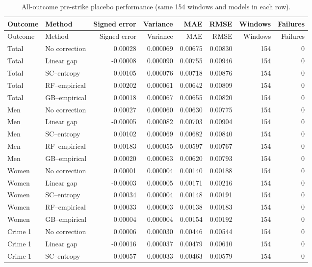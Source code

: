 \begin{longtable}{llrrrrrr}
\caption{All-outcome pre-strike placebo performance (same 154 windows and models in each row).}\label{tab:allplaceborebuild}\\
\toprule
Outcome & Method & Signed error & Variance & MAE & RMSE & Windows & Failures\\
\midrule
\endfirsthead
\toprule
Outcome & Method & Signed error & Variance & MAE & RMSE & Windows & Failures\\
\midrule
\endhead
Total & No correction & 0.00028 & 0.000069 & 0.00675 & 0.00830 & 154 & 0\\
Total & Linear gap & -0.00008 & 0.000090 & 0.00755 & 0.00946 & 154 & 0\\
Total & SC--entropy & 0.00105 & 0.000076 & 0.00718 & 0.00876 & 154 & 0\\
Total & RF--empirical & 0.00202 & 0.000061 & 0.00642 & 0.00809 & 154 & 0\\
Total & GB--empirical & 0.00018 & 0.000067 & 0.00655 & 0.00820 & 154 & 0\\
\midrule
Men & No correction & 0.00027 & 0.000060 & 0.00630 & 0.00775 & 154 & 0\\
Men & Linear gap & -0.00005 & 0.000082 & 0.00703 & 0.00904 & 154 & 0\\
Men & SC--entropy & 0.00102 & 0.000069 & 0.00682 & 0.00840 & 154 & 0\\
Men & RF--empirical & 0.00183 & 0.000055 & 0.00597 & 0.00767 & 154 & 0\\
Men & GB--empirical & 0.00020 & 0.000063 & 0.00620 & 0.00793 & 154 & 0\\
\midrule
Women & No correction & 0.00001 & 0.000004 & 0.00140 & 0.00188 & 154 & 0\\
Women & Linear gap & -0.00003 & 0.000005 & 0.00171 & 0.00216 & 154 & 0\\
Women & SC--entropy & 0.00034 & 0.000004 & 0.00148 & 0.00191 & 154 & 0\\
Women & RF--empirical & 0.00033 & 0.000003 & 0.00138 & 0.00183 & 154 & 0\\
Women & GB--empirical & 0.00004 & 0.000004 & 0.00154 & 0.00192 & 154 & 0\\
\midrule
Crime 1 & No correction & 0.00006 & 0.000030 & 0.00446 & 0.00544 & 154 & 0\\
Crime 1 & Linear gap & -0.00016 & 0.000037 & 0.00479 & 0.00610 & 154 & 0\\
Crime 1 & SC--entropy & 0.00057 & 0.000033 & 0.00463 & 0.00579 & 154 & 0\\

\end{longtable}
